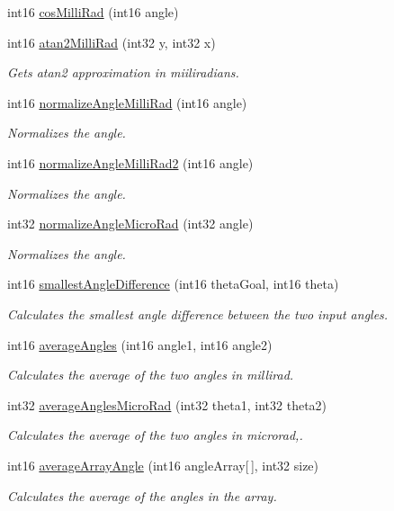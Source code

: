 \begin{DoxyCompactItemize}
int16 \hyperlink{group__kernel_gac1cf09ca3eee6afd3b10336ee379499b}{cosMilliRad} (int16 angle)
\item 
int16 \hyperlink{group__kernel_ga1f218222edc73fbd18dfcf47d9542a9b}{atan2MilliRad} (int32 y, int32 x)
\begin{DoxyCompactList}\small\item\em Gets atan2 approximation in miiliradians. \end{DoxyCompactList}\item 
int16 \hyperlink{group__kernel_ga5231492647a7f6d3f3d3a32e6ca01443}{normalizeAngleMilliRad} (int16 angle)
\begin{DoxyCompactList}\small\item\em Normalizes the angle. \end{DoxyCompactList}\item 
int16 \hyperlink{group__kernel_ga1e615bf4f7531815855c532d3a14aad9}{normalizeAngleMilliRad2} (int16 angle)
\begin{DoxyCompactList}\small\item\em Normalizes the angle. \end{DoxyCompactList}\item 
int32 \hyperlink{group__kernel_ga9e055eb22ac5e1998989df3e3d2e56df}{normalizeAngleMicroRad} (int32 angle)
\begin{DoxyCompactList}\small\item\em Normalizes the angle. \end{DoxyCompactList}\item 
int16 \hyperlink{group__kernel_ga656f7470125f125f27498a2d73eb360d}{smallestAngleDifference} (int16 thetaGoal, int16 theta)
\begin{DoxyCompactList}\small\item\em Calculates the smallest angle difference between the two input angles. \end{DoxyCompactList}\item 
int16 \hyperlink{group__kernel_ga22381e287b289e40aaeee3cfd24ceeb0}{averageAngles} (int16 angle1, int16 angle2)
\begin{DoxyCompactList}\small\item\em Calculates the average of the two angles in millirad. \end{DoxyCompactList}\item 
int32 \hyperlink{group__kernel_ga9054288f0277dbfaefbcddb2ce91cbc5}{averageAnglesMicroRad} (int32 theta1, int32 theta2)
\begin{DoxyCompactList}\small\item\em Calculates the average of the two angles in microrad,. \end{DoxyCompactList}\item 
int16 \hyperlink{group__kernel_ga4df4d9942bd8770a19eb7fd4acdff4b6}{averageArrayAngle} (int16 angleArray\mbox{[}$\,$\mbox{]}, int32 size)
\begin{DoxyCompactList}\small\item\em Calculates the average of the angles in the array. \end{DoxyCompactList}\end{DoxyCompactItemize}


